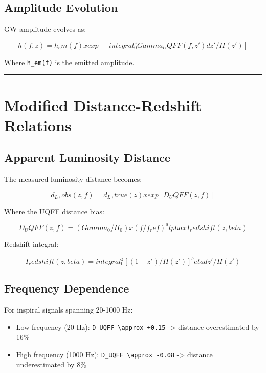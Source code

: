 \documentclass[12pt,a4paper]{article}
\begin{document}
\subsection{Amplitude Evolution}

GW amplitude evolves as:

\begin{equation}
h(f,z) = h_em(f) x exp[-integral_0^z Gamma_UQFF(f,z') dz' / H(z')]
\end{equation}

Where \texttt{h\_em(f)} is the emitted amplitude.

\medskip\hrule\medskip

\section{Modified Distance-Redshift Relations}

\subsection{Apparent Luminosity Distance}

The measured luminosity distance becomes:

\begin{equation}
d_L,obs(z,f) = d_L,true(z) x exp[D_UQFF(z,f)]
\end{equation}

Where the UQFF distance bias:

\begin{equation}
D_UQFF(z,f) = (Gamma_0/H_0) x (f/f_ref)^alpha x I_redshift(z,beta)
\end{equation}

Redshift integral:

\begin{equation}
I_redshift(z,beta) = integral_0^z [(1+z')/H(z')]^beta dz' / H(z')
\end{equation}

\subsection{Frequency Dependence}

For inspiral signals spanning 20-1000 Hz:

\begin{itemize}
  \item Low frequency (20 Hz): \texttt{D\_UQFF \textbackslash approx +0.15} -> distance overestimated by 16\%
  \item High frequency (1000 Hz): \texttt{D\_UQFF \textbackslash approx -0.08} -> distance underestimated by 8\%
\end{itemize}
\end{document}
